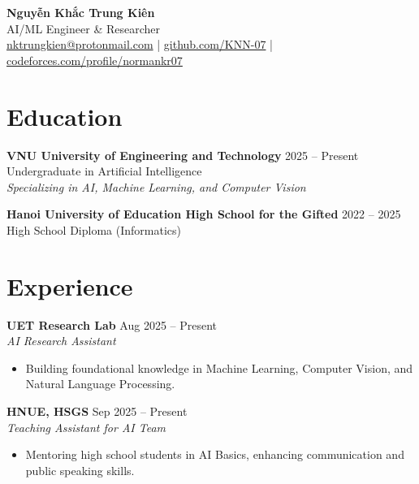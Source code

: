 \documentclass[11pt,a4paper]{article}
\begin{document}
\begin{center}
    {\Huge \textbf{Nguyễn Khắc Trung Kiên}} \\ \vspace{5pt}
    AI/ML Engineer \& Researcher \\ \vspace{2pt}
    \href{mailto:nktrungkien@protonmail.com}{nktrungkien@protonmail.com} \quad|\quad
    \href{https://github.com/KNN-07}{github.com/KNN-07} \quad|\quad
    \href{https://codeforces.com/profile/normankr07}{codeforces.com/profile/normankr07}
\end{center}

\vspace{-10pt}

\section{Education}
\noindent \textbf{VNU University of Engineering and Technology} \hfill 2025 -- Present\\
Undergraduate in Artificial Intelligence\\
\textit{Specializing in AI, Machine Learning, and Computer Vision}

\vspace{5pt}

\noindent \textbf{Hanoi University of Education High School for the Gifted} \hfill 2022 -- 2025\\
High School Diploma (Informatics)

\section{Experience}
\noindent \textbf{UET Research Lab} \hfill Aug 2025 -- Present\\
\textit{AI Research Assistant}
\begin{itemize}[leftmargin=*, parsep=0pt, itemsep=2pt, topsep=2pt]
    \item Building foundational knowledge in Machine Learning, Computer Vision, and Natural Language Processing.
\end{itemize}

\vspace{5pt}

\noindent \textbf{HNUE, HSGS} \hfill Sep 2025 -- Present\\
\textit{Teaching Assistant for AI Team}
\begin{itemize}[leftmargin=*, parsep=0pt, itemsep=2pt, topsep=2pt]
    \item Mentoring high school students in AI Basics, enhancing communication and public speaking skills.
\end{itemize}
\end{document}
